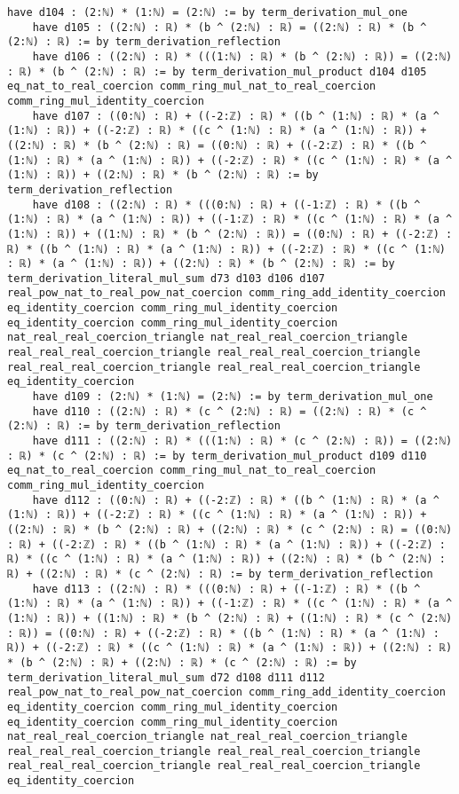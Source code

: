 \documentclass{article}
\begin{document}
\begin{tcolorbox}[colback=white!10, width=\linewidth]
\begin{lstlisting}[language=Lean4]
    have d104 : (2:ℕ) * (1:ℕ) = (2:ℕ) := by term_derivation_mul_one
    have d105 : ((2:ℕ) : ℝ) * (b ^ (2:ℕ) : ℝ) = ((2:ℕ) : ℝ) * (b ^ (2:ℕ) : ℝ) := by term_derivation_reflection
    have d106 : ((2:ℕ) : ℝ) * (((1:ℕ) : ℝ) * (b ^ (2:ℕ) : ℝ)) = ((2:ℕ) : ℝ) * (b ^ (2:ℕ) : ℝ) := by term_derivation_mul_product d104 d105 eq_nat_to_real_coercion comm_ring_mul_nat_to_real_coercion comm_ring_mul_identity_coercion
    have d107 : ((0:ℕ) : ℝ) + ((-2:ℤ) : ℝ) * ((b ^ (1:ℕ) : ℝ) * (a ^ (1:ℕ) : ℝ)) + ((-2:ℤ) : ℝ) * ((c ^ (1:ℕ) : ℝ) * (a ^ (1:ℕ) : ℝ)) + ((2:ℕ) : ℝ) * (b ^ (2:ℕ) : ℝ) = ((0:ℕ) : ℝ) + ((-2:ℤ) : ℝ) * ((b ^ (1:ℕ) : ℝ) * (a ^ (1:ℕ) : ℝ)) + ((-2:ℤ) : ℝ) * ((c ^ (1:ℕ) : ℝ) * (a ^ (1:ℕ) : ℝ)) + ((2:ℕ) : ℝ) * (b ^ (2:ℕ) : ℝ) := by term_derivation_reflection
    have d108 : ((2:ℕ) : ℝ) * (((0:ℕ) : ℝ) + ((-1:ℤ) : ℝ) * ((b ^ (1:ℕ) : ℝ) * (a ^ (1:ℕ) : ℝ)) + ((-1:ℤ) : ℝ) * ((c ^ (1:ℕ) : ℝ) * (a ^ (1:ℕ) : ℝ)) + ((1:ℕ) : ℝ) * (b ^ (2:ℕ) : ℝ)) = ((0:ℕ) : ℝ) + ((-2:ℤ) : ℝ) * ((b ^ (1:ℕ) : ℝ) * (a ^ (1:ℕ) : ℝ)) + ((-2:ℤ) : ℝ) * ((c ^ (1:ℕ) : ℝ) * (a ^ (1:ℕ) : ℝ)) + ((2:ℕ) : ℝ) * (b ^ (2:ℕ) : ℝ) := by term_derivation_literal_mul_sum d73 d103 d106 d107 real_pow_nat_to_real_pow_nat_coercion comm_ring_add_identity_coercion eq_identity_coercion comm_ring_mul_identity_coercion eq_identity_coercion comm_ring_mul_identity_coercion nat_real_real_coercion_triangle nat_real_real_coercion_triangle real_real_real_coercion_triangle real_real_real_coercion_triangle real_real_real_coercion_triangle real_real_real_coercion_triangle eq_identity_coercion
    have d109 : (2:ℕ) * (1:ℕ) = (2:ℕ) := by term_derivation_mul_one
    have d110 : ((2:ℕ) : ℝ) * (c ^ (2:ℕ) : ℝ) = ((2:ℕ) : ℝ) * (c ^ (2:ℕ) : ℝ) := by term_derivation_reflection
    have d111 : ((2:ℕ) : ℝ) * (((1:ℕ) : ℝ) * (c ^ (2:ℕ) : ℝ)) = ((2:ℕ) : ℝ) * (c ^ (2:ℕ) : ℝ) := by term_derivation_mul_product d109 d110 eq_nat_to_real_coercion comm_ring_mul_nat_to_real_coercion comm_ring_mul_identity_coercion
    have d112 : ((0:ℕ) : ℝ) + ((-2:ℤ) : ℝ) * ((b ^ (1:ℕ) : ℝ) * (a ^ (1:ℕ) : ℝ)) + ((-2:ℤ) : ℝ) * ((c ^ (1:ℕ) : ℝ) * (a ^ (1:ℕ) : ℝ)) + ((2:ℕ) : ℝ) * (b ^ (2:ℕ) : ℝ) + ((2:ℕ) : ℝ) * (c ^ (2:ℕ) : ℝ) = ((0:ℕ) : ℝ) + ((-2:ℤ) : ℝ) * ((b ^ (1:ℕ) : ℝ) * (a ^ (1:ℕ) : ℝ)) + ((-2:ℤ) : ℝ) * ((c ^ (1:ℕ) : ℝ) * (a ^ (1:ℕ) : ℝ)) + ((2:ℕ) : ℝ) * (b ^ (2:ℕ) : ℝ) + ((2:ℕ) : ℝ) * (c ^ (2:ℕ) : ℝ) := by term_derivation_reflection
    have d113 : ((2:ℕ) : ℝ) * (((0:ℕ) : ℝ) + ((-1:ℤ) : ℝ) * ((b ^ (1:ℕ) : ℝ) * (a ^ (1:ℕ) : ℝ)) + ((-1:ℤ) : ℝ) * ((c ^ (1:ℕ) : ℝ) * (a ^ (1:ℕ) : ℝ)) + ((1:ℕ) : ℝ) * (b ^ (2:ℕ) : ℝ) + ((1:ℕ) : ℝ) * (c ^ (2:ℕ) : ℝ)) = ((0:ℕ) : ℝ) + ((-2:ℤ) : ℝ) * ((b ^ (1:ℕ) : ℝ) * (a ^ (1:ℕ) : ℝ)) + ((-2:ℤ) : ℝ) * ((c ^ (1:ℕ) : ℝ) * (a ^ (1:ℕ) : ℝ)) + ((2:ℕ) : ℝ) * (b ^ (2:ℕ) : ℝ) + ((2:ℕ) : ℝ) * (c ^ (2:ℕ) : ℝ) := by term_derivation_literal_mul_sum d72 d108 d111 d112 real_pow_nat_to_real_pow_nat_coercion comm_ring_add_identity_coercion eq_identity_coercion comm_ring_mul_identity_coercion eq_identity_coercion comm_ring_mul_identity_coercion nat_real_real_coercion_triangle nat_real_real_coercion_triangle real_real_real_coercion_triangle real_real_real_coercion_triangle real_real_real_coercion_triangle real_real_real_coercion_triangle eq_identity_coercion

\end{lstlisting}
\end{tcolorbox}
\end{document}
